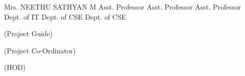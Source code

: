 \begin{titlepage}
\begin{FlushLeft}
\begin{footnotesize}
				Mrs. NEETHU SATHYAN M \newline
				Asst. Professor\hspace{2.5cm}	
				Asst. Professor\hspace{2.55cm}
				Asst. Professor\newline
				Dept. of IT\hspace{3.1cm}
				Dept. of CSE\hspace{2.75cm}
				Dept. of CSE\newline
				\begin{scriptsize}
					(Project Guide)
				\end{scriptsize}\hspace{2.6cm}
				\begin{scriptsize}
					(Project Co-Ordinator)
				\end{scriptsize}\hspace{1.7cm}
				(HOD)\newline
				
				
			\end{footnotesize}
		\end{FlushLeft}
		

	

\end{titlepage}


